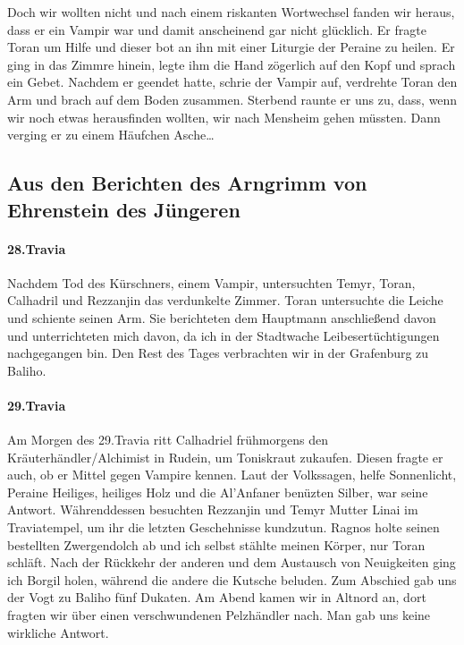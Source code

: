 Doch wir wollten nicht und nach einem riskanten Wortwechsel fanden wir heraus, dass er ein Vampir war und damit anscheinend gar nicht glücklich. Er fragte Toran um Hilfe und dieser bot an ihn mit einer Liturgie der Peraine zu heilen. Er ging in das Zimmre hinein, legte ihm die Hand zögerlich auf den Kopf und sprach ein Gebet. Nachdem er geendet hatte, schrie der Vampir auf, verdrehte Toran den Arm und brach auf dem Boden zusammen. Sterbend raunte er uns zu, dass, wenn wir noch etwas herausfinden wollten, wir nach Mensheim gehen müssten. Dann verging er zu einem Häufchen Asche\dots 

\subsection{Aus den Berichten des Arngrimm von Ehrenstein des Jüngeren}

\paragraph{28.Travia}
Nachdem Tod des Kürschners, einem Vampir, untersuchten Temyr, Toran, Calhadril und Rezzanjin das verdunkelte Zimmer. Toran untersuchte die Leiche und schiente seinen Arm. Sie berichteten dem Hauptmann anschließend davon und unterrichteten mich davon, da ich in der Stadtwache Leibesertüchtigungen nachgegangen bin. Den Rest des Tages verbrachten wir in der Grafenburg zu Baliho.

\paragraph{29.Travia}
Am Morgen des 29.Travia ritt Calhadriel frühmorgens den Kräuterhändler/Alchimist in Rudein, um Toniskraut zukaufen. Diesen fragte er auch, ob er Mittel gegen Vampire kennen. Laut der Volkssagen, helfe Sonnenlicht, Peraine Heiliges, heiliges Holz und die Al'Anfaner benüzten Silber, war seine Antwort. Währenddessen besuchten Rezzanjin und Temyr Mutter Linai im Traviatempel, um ihr die letzten Geschehnisse kundzutun. Ragnos holte seinen bestellten Zwergendolch ab und ich selbst stählte meinen Körper, nur Toran schläft. Nach der Rückkehr der anderen und dem Austausch von Neuigkeiten ging ich Borgil holen, während die andere die Kutsche beluden. Zum Abschied gab uns der Vogt zu Baliho fünf Dukaten. Am Abend kamen wir in Altnord an, dort fragten wir über einen verschwundenen Pelzhändler nach. Man gab uns keine wirkliche Antwort.

